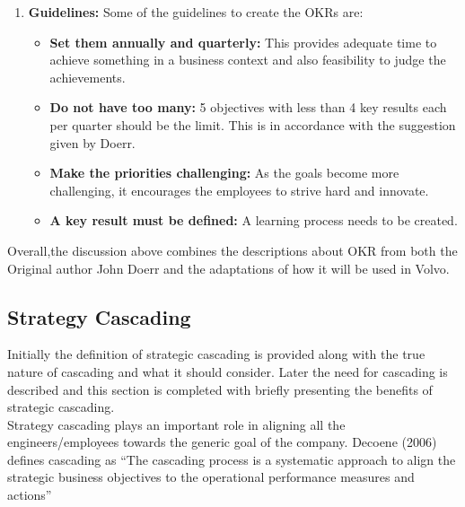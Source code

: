 \begin{enumerate}
    \item \textbf{Guidelines:} Some of the guidelines to create the OKRs are:\\
    \begin{itemize}
        \item \textbf{Set them annually and quarterly:} This provides adequate time to achieve something in a business context and also feasibility to judge the achievements.\\
        \item \textbf{Do not have too many:} 5 objectives with less than 4 key results each per quarter should be the limit. This is in accordance with the suggestion given by Doerr.\\ 
        \item \textbf{Make the priorities challenging:} As the goals become more challenging, it encourages the employees to strive hard and innovate.\\
        \item \textbf{A key result must be defined:} A learning process needs to be created.\\
\end{itemize}
\end{enumerate}
Overall,the discussion above combines the descriptions about OKR from both the Original author John Doerr and the adaptations of how it will be used in Volvo.\\



\subsection{Strategy Cascading}
Initially the definition of strategic cascading is provided along with the true nature of cascading and what it should consider. Later the need for cascading is described and this section is completed with briefly presenting the benefits of strategic cascading.\\

Strategy cascading plays an important role in aligning all the engineers/employees towards the generic goal of the company. Decoene (2006) defines cascading as “The cascading process is a systematic approach to align the strategic business objectives to the operational performance measures and actions”\\



